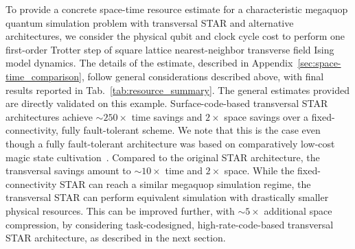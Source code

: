 \documentclass[aps, prx, reprint, superscriptaddress, longbibliography, floatfix]{revtex4-2}
\begin{document}
To provide a concrete space-time resource estimate for a characteristic megaquop quantum simulation problem with transversal STAR and alternative architectures, we consider the physical qubit and clock cycle cost to perform one first-order Trotter step of square lattice nearest-neighbor transverse field Ising model dynamics. The details of the estimate, described in Appendix~\ref{sec:space-time_comparison}, follow general considerations described above, with final results reported in Tab.~\ref{tab:resource_summary}. The general estimates provided are directly validated on this example. Surface-code-based transversal STAR architectures achieve $\sim 250 \times$ time savings and $2\times$ space savings over a fixed-connectivity, fully fault-tolerant scheme. We note that this is the case even though a fully fault-tolerant architecture was based on comparatively low-cost magic state cultivation~\cite{Gidney2024}. Compared to the original STAR architecture, the transversal savings amount to $\sim 10\times$ time and $2\times$ space. While the fixed-connectivity STAR can reach a similar megaquop simulation regime, the transversal STAR can perform equivalent simulation with drastically smaller physical resources. This can be improved further, with $\sim 5 \times$ additional space compression, by considering task-codesigned, high-rate-code-based transversal STAR architecture, as described in the next section.
\end{document}

